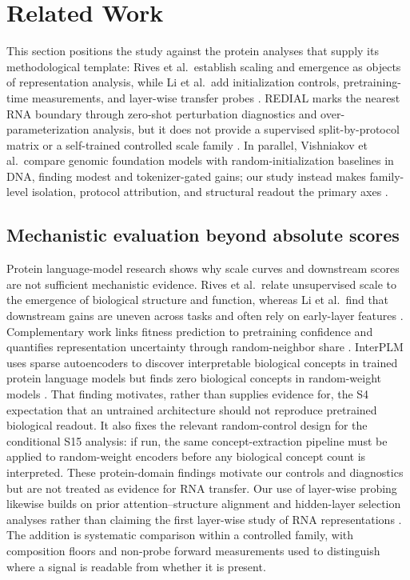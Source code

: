 \hypertarget{related-work}{%
\section{Related Work}\label{related-work}}

This section positions the study against the protein analyses that supply its methodological template: Rives et al.~establish scaling and emergence as objects of representation analysis, while Li et al.~add initialization controls, pretraining-time measurements, and layer-wise transfer probes \citep{rives_biological,li_feature}. REDIAL marks the nearest RNA boundary through zero-shot perturbation diagnostics and over-parameterization analysis, but it does not provide a supervised split-by-protocol matrix or a self-trained controlled scale family \citep{redial}. In parallel, Vishniakov et al.~compare genomic foundation models with random-initialization baselines in DNA, finding modest and tokenizer-gated gains; our study instead makes family-level isolation, protocol attribution, and structural readout the primary axes \citep{vishniakov_tokenization}.

\hypertarget{mechanistic-evaluation-beyond-absolute-scores}{%
\subsection{Mechanistic evaluation beyond absolute scores}\label{mechanistic-evaluation-beyond-absolute-scores}}

Protein language-model research shows why scale curves and downstream scores are not sufficient mechanistic evidence. Rives et al.~relate unsupervised scale to the emergence of biological structure and function, whereas Li et al.~find that downstream gains are uneven across tasks and often rely on early-layer features \citep{rives_biological,li_feature}. Complementary work links fitness prediction to pretraining confidence and quantifies representation uncertainty through random-neighbor share \citep{hou_scaling,prabakaran_uncertainty}. InterPLM uses sparse autoencoders to discover interpretable biological concepts in trained protein language models but finds zero biological concepts in random-weight models \citep{simon_interplm}. That finding motivates, rather than supplies evidence for, the S4 expectation that an untrained architecture should not reproduce pretrained biological readout. It also fixes the relevant random-control design for the conditional S15 analysis: if run, the same concept-extraction pipeline must be applied to random-weight encoders before any biological concept count is interpreted. These protein-domain findings motivate our controls and diagnostics but are not treated as evidence for RNA transfer. Our use of layer-wise probing likewise builds on prior attention--structure alignment and hidden-layer selection analyses rather than claiming the first layer-wise study of RNA representations \citep{papazoglou_attention,zablocki_structure}. The addition is systematic comparison within a controlled family, with composition floors and non-probe forward measurements used to distinguish where a signal is readable from whether it is present.

